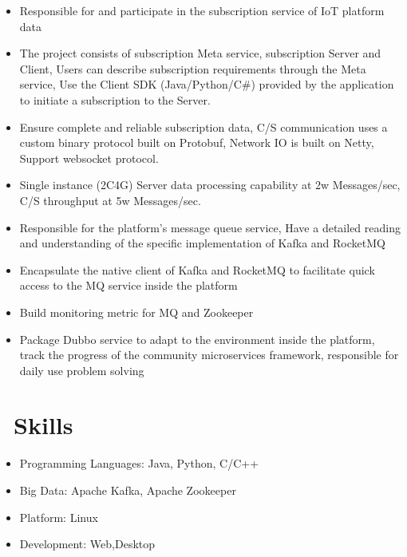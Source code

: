 \documentclass{resume}
\begin{document}
\begin{itemize}
    \item Responsible for and participate in the subscription service of IoT platform data
    \item The project consists of subscription Meta service, subscription Server and Client, Users can describe subscription requirements through the Meta service, Use the Client SDK (Java/Python/C#) provided by the application to initiate a subscription to the Server.
    \item Ensure complete and reliable subscription data, C/S communication uses a custom binary protocol built on Protobuf, Network IO is built on Netty, Support websocket protocol.
    \item Single instance (2C4G) Server data processing capability at 2w Messages/sec, C/S throughput at 5w Messages/sec.
\end{itemize}

\begin{itemize}
    \item Responsible for the platform's message queue service, Have a detailed reading and understanding of the specific implementation of Kafka and RocketMQ
    \item Encapsulate the native client of Kafka and RocketMQ to facilitate quick access to the MQ service inside the platform
    \item Build monitoring metric for MQ and Zookeeper
    \item Package Dubbo service to adapt to the environment inside the platform, track the progress of the community microservices framework, responsible for daily use problem solving
\end{itemize}

\section{\faCogs\ Skills}
\begin{itemize}[parsep=0.5ex]
  \item Programming Languages: Java, Python, C/C++
  \item Big Data: Apache Kafka, Apache Zookeeper
  \item Platform: Linux
  \item Development: Web,Desktop
\end{itemize}
\end{document}
